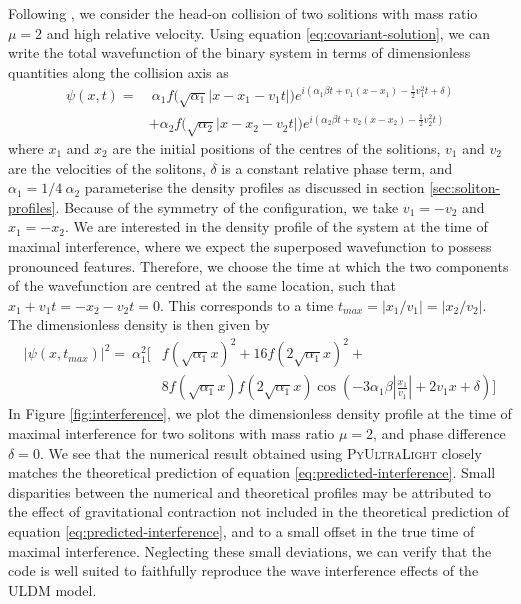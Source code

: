 \documentclass[a4paper,11pt]{article}
\newcommand{\PyUltraLight}{\textsc{PyUltraLight }}
\begin{document}
Following \cite{Schwabe2016}, we consider the head-on collision of two solitions with mass ratio $\mu=2$ and high relative velocity. Using equation \ref{eq:covariant-solution}, we can write the total wavefunction of the binary system in terms of dimensionless quantities along the collision axis as
\begin{align}
    \psi(x,t)=& \ \alpha_1 f\big(\sqrt{\alpha_1}\vert x-x_1-v_1 t\vert\big)e^{i\left(\alpha_1\beta t+v_1(x-x_1)-\frac{1}{2}v_1^2 t+\delta\right)}\nonumber\\
    &+\alpha_2 f\big(\sqrt{\alpha_2}\vert x-x_2-v_2 t\vert\big)e^{i\left(\alpha_2\beta t+v_2(x-x_2)-\frac{1}{2}v_2^2 t\right)}
\end{align}
where $x_1$ and $x_2$ are the initial positions of the centres of the solitions, $v_1$ and $v_2$ are the velocities of the solitons, $\delta$ is a constant relative phase term, and $\alpha_1=1/4 \ \alpha_2$ parameterise the density profiles as discussed in section \ref{sec:soliton-profiles}. Because of the symmetry of the configuration, we take $v_1=-v_2$ and $x_1=-x_2$. We are interested in the density profile of the system at the time of maximal interference, where we expect the superposed wavefunction to possess pronounced features. Therefore, we choose the time at which the two components of the wavefunction are centred at the same location, such that $x_1+v_1t=-x_2-v_2t=0$. This corresponds to a time $t_{max}=\vert x_1/v_1\vert = \vert x_2/v_2\vert$. The dimensionless density is then given by
\begin{align}\label{eq:predicted-interference}
    \vert\psi(x,t_{max})\vert^2= \ \alpha_1^2\bigg[&f(\sqrt{\alpha_1}x)^2+16f(2\sqrt{\alpha_1}x)^2+\nonumber\\
    &8f(\sqrt{\alpha_1}x)f(2\sqrt{\alpha_1}x)\operatorname{cos}\left(-3\alpha_1\beta\left\vert\frac{x_1}{v_1}\right\vert+2v_1x+\delta \right)\bigg]
\end{align}
In Figure \ref{fig:interference}, we plot the dimensionless density profile at the time of maximal interference for two solitons with mass ratio $\mu=2$, and phase difference $\delta=0$. We see that the numerical result obtained using \PyUltraLight closely matches the theoretical prediction of equation \ref{eq:predicted-interference}. Small disparities between the numerical and theoretical profiles may be attributed to the effect of gravitational contraction not included in the theoretical prediction of equation \ref{eq:predicted-interference}, and to a small offset in the true time of maximal interference. Neglecting these small deviations, we can verify that the code is well suited to faithfully reproduce the wave interference effects of the ULDM model. 
\end{document}
